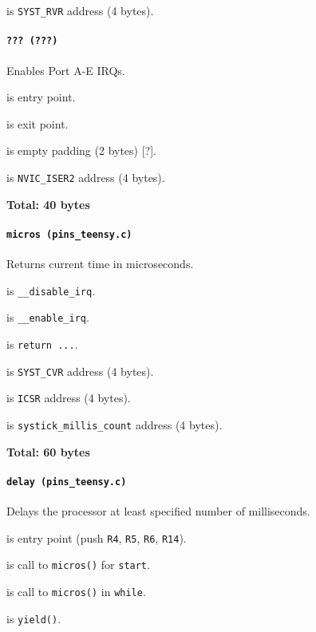  is \texttt{SYST\_RVR} address (4 bytes).

\paragraph{\texttt{??? (???)}} Enables Port A-E IRQs.

 is entry point.

 is exit point.

 is empty padding (2 bytes) [?].

 is \texttt{NVIC\_ISER2} address (4 bytes).

\textbf{Total: 40 bytes}


\paragraph{\texttt{micros (pins\_teensy.c)}} Returns current time in
microseconds.

 is \texttt{\_\_disable\_irq}.

 is \texttt{\_\_enable\_irq}.

 is \texttt{return ...}.

\vspace{1em}

 is \texttt{SYST\_CVR} address (4 bytes).

 is \texttt{ICSR} address (4 bytes).

 is \texttt{systick\_millis\_count} address (4 bytes).

\textbf{Total: 60 bytes}

\paragraph{\texttt{delay (pins\_teensy.c)}} Delays the processor at least
specified number of milliseconds.

 is entry point (push \texttt{R4}, \texttt{R5},
\texttt{R6}, \texttt{R14}).

 is call to \texttt{micros()} for \texttt{start}.

 is call to \texttt{micros()} in \texttt{while}.

 is \texttt{yield()}.

